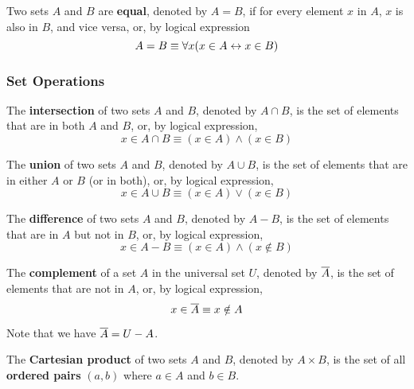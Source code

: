 \begin{definition}
    Two sets $A$ and $B$ are \textbf{equal}, denoted by $A = B$, if for every element $x$ in $A$,
    $x$ is also in $B$, and vice versa, or, by logical expression
    \[
        A=B \equiv \forall x (x \in A \leftrightarrow x \in B)
    \]
\end{definition}

\subsubsection{Set Operations}

\begin{definition}
    The \textbf{intersection} of two sets $A$ and $B$, denoted by $A \cap B$,
    is the set of elements that are in both $A$ and $B$, or, by logical expression,
    \[
        x\in A\cap B \equiv (x \in A) \land (x \in B)
    \]
\end{definition}

\begin{definition}
    The \textbf{union} of two sets $A$ and $B$, denoted by $A \cup B$,
    is the set of elements that are in either $A$ or $B$ (or in both), or, by logical expression,
    \[
        x\in A\cup B \equiv (x \in A) \lor (x \in B)
    \]
\end{definition}

\begin{definition}[Difference $-$]
    The \textbf{difference} of two sets $A$ and $B$, denoted by $A - B$,
    is the set of elements that are in $A$ but not in $B$, or, by logical expression,
    \[
        x \in A - B \equiv (x \in A) \land (x \notin B)
    \]
\end{definition}

\begin{definition}
    The \textbf{complement} of a set $A$ in the universal set $U$, denoted by $\overline{A}$,
    is the set of elements that are not in $A$, or, by logical expression,
    \[
        x \in \overline{A} \equiv x \notin A
    \]
    
    Note that we have $\overline{A} = U - A$.
\end{definition}

\begin{definition}
    The \textbf{Cartesian product} of two sets $A$ and $B$, denoted by $A \times B$,
    is the set of all \textbf{ordered pairs} $(a, b)$ where $a \in A$ and $b \in B$.
\end{definition}

